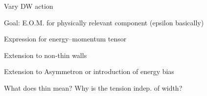 






\begin{bullets}
    \item Vary DW action
    \item Goal: E.O.M. for physically relevant component (epsilon basically)
    \item Expression for energy--momentum tensor
    \item Extension to non-thin walls 
    \item Extension to Asymmetron or introduction of energy bias
    \item What does thin mean? Why is the tension indep. of width?
\end{bullets}




